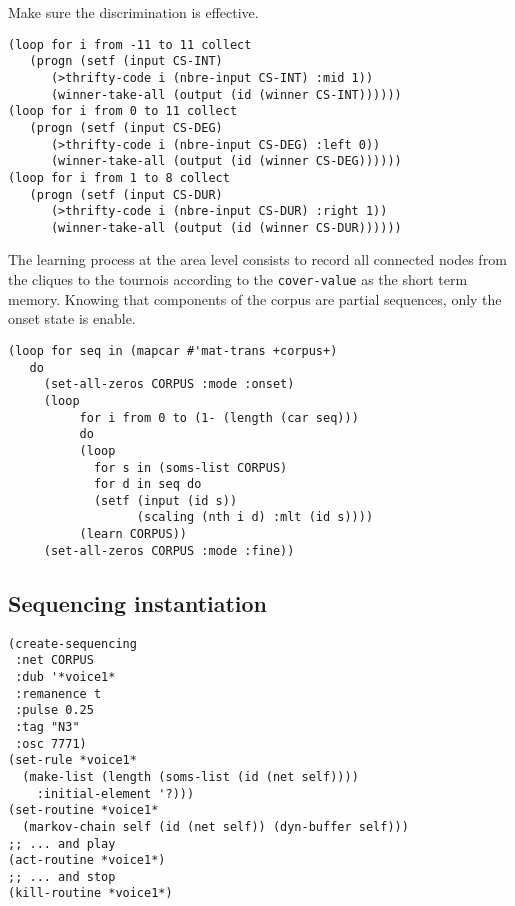 Make sure the discrimination is effective. 
\begin{lstlisting}[language=N3]
(loop for i from -11 to 11 collect 
   (progn (setf (input CS-INT) 
      (>thrifty-code i (nbre-input CS-INT) :mid 1)) 
      (winner-take-all (output (id (winner CS-INT))))))
(loop for i from 0 to 11 collect 
   (progn (setf (input CS-DEG) 
      (>thrifty-code i (nbre-input CS-DEG) :left 0)) 
      (winner-take-all (output (id (winner CS-DEG))))))
(loop for i from 1 to 8 collect 
   (progn (setf (input CS-DUR) 
      (>thrifty-code i (nbre-input CS-DUR) :right 1)) 
      (winner-take-all (output (id (winner CS-DUR))))))
\end{lstlisting}
The learning process at the area level consists to record all connected nodes from the cliques to the tournois according to the \texttt{cover-value} as the short term memory. Knowing that components of the corpus are partial sequences, only the onset state is enable.
\begin{lstlisting}[language=N3]
(loop for seq in (mapcar #'mat-trans +corpus+)
   do     
     (set-all-zeros CORPUS :mode :onset)  
     (loop
	      for i from 0 to (1- (length (car seq))) 
	      do
	      (loop
	        for s in (soms-list CORPUS)
	        for d in seq do
	        (setf (input (id s)) 
	              (scaling (nth i d) :mlt (id s))))
	      (learn CORPUS))
     (set-all-zeros CORPUS :mode :fine))
\end{lstlisting}

\subsection{Sequencing instantiation}

\begin{lstlisting}[language=N3]
(create-sequencing
 :net CORPUS
 :dub '*voice1*
 :remanence t
 :pulse 0.25
 :tag "N3"
 :osc 7771)
(set-rule *voice1* 
  (make-list (length (soms-list (id (net self)))) 
    :initial-element '?)))
(set-routine *voice1* 
  (markov-chain self (id (net self)) (dyn-buffer self)))
;; ... and play
(act-routine *voice1*)
;; ... and stop
(kill-routine *voice1*)
\end{lstlisting}
